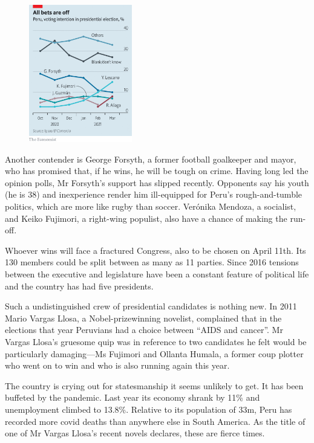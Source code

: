 \documentclass{article}
\begin{document}
\begin{figure}[h]
\centering
\includegraphics[width=0.4\textwidth]{images/20210327_amc288.png}
\end{figure}


Another contender is George Forsyth, a former football goalkeeper and mayor, who has promised that, if he wins, he will be tough on crime. Having long led the opinion polls, Mr Forsyth's support has slipped recently. Opponents say his youth (he is 38) and inexperience render him ill-equipped for Peru's rough-and-tumble politics, which are more like rugby than soccer. Verónika Mendoza, a socialist, and Keiko Fujimori, a right-wing populist, also have a chance of making the run-off. 

Whoever wins will face a fractured Congress, also to be chosen on April 11th. Its 130 members could be split between as many as 11 parties. Since 2016 tensions between the executive and legislature have been a constant feature of political life and the country has had five presidents. 

Such a undistinguished crew of presidential candidates is nothing new. In 2011 Mario Vargas Llosa, a Nobel-prizewinning novelist, complained that in the elections that year Peruvians had a choice between ``AIDS and cancer''. Mr Vargas Llosa's gruesome quip was in reference to two candidates he felt would be particularly damaging---Ms Fujimori and Ollanta Humala, a former coup plotter who went on to win and who is also running again this year. 

The country is crying out for statesmanship it seems unlikely to get. It has been buffeted by the pandemic. Last year its economy shrank by 11\% and unemployment climbed to 13.8\%. Relative to its population of 33m, Peru has recorded more covid deaths than anywhere else in South America. As the title of one of Mr Vargas Llosa's recent novels declares, these are fierce times.{} 
\clearpage
\end{document}
